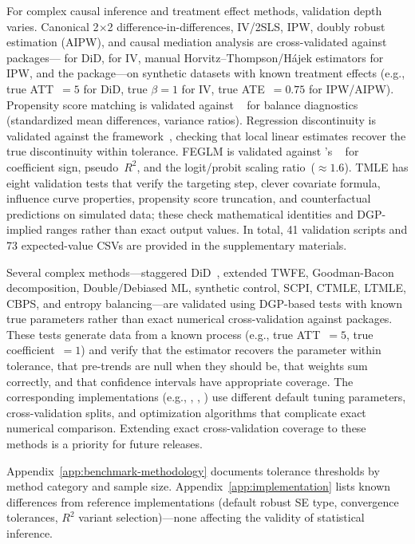 For complex causal inference and treatment effect methods, validation
depth varies. Canonical 2$\times$2 difference-in-differences, IV/2SLS,
IPW, doubly robust estimation (AIPW), and causal mediation analysis
are cross-validated against  packages--- for DiD,
 for IV, manual Horvitz--Thompson/H\'{a}jek estimators for
IPW, and the  package---on
synthetic datasets with known treatment effects (e.g., true ATT~$=5$
for DiD, true $\beta=1$ for IV, true ATE~$=0.75$ for IPW/AIPW).
Propensity score matching is validated against
~\citep{Ho+etal:2011} for balance diagnostics
(standardized mean differences, variance ratios).  Regression
discontinuity is validated against the 
framework~\citep{Calonico+etal:2014}, checking that local
linear estimates recover the true discontinuity within tolerance.
FEGLM is validated against 's
~\citep{Berge:2018} for coefficient sign, pseudo~$R^2$,
and the logit/probit scaling ratio~($\approx 1.6$).  TMLE has eight
validation tests that verify the targeting step, clever covariate
formula, influence curve properties, propensity score truncation, and
counterfactual predictions on simulated data; these check mathematical
identities and DGP-implied ranges rather than exact 
output values. In total, 41  validation scripts and
73 expected-value CSVs are provided in the supplementary materials.

Several complex methods---staggered
DiD~\citep{Callaway+SantAnna:2021}, extended TWFE, Goodman-Bacon
decomposition, Double/Debiased ML, synthetic control, SCPI, CTMLE,
LTMLE, CBPS, and entropy balancing---are validated using
DGP-based tests with known true parameters rather than exact numerical
cross-validation against  packages.  These tests generate
data from a known process (e.g., true ATT~$=5$, true coefficient~$=1$)
and verify that the estimator recovers the parameter within tolerance,
that pre-trends are null when they should be, that weights sum correctly,
and that confidence intervals have appropriate coverage.
The corresponding  implementations (e.g.,
, , ) use different default tuning
parameters, cross-validation splits, and optimization algorithms that
complicate exact numerical comparison.  Extending
exact cross-validation coverage to these methods is a priority for future
releases.

Appendix~\ref{app:benchmark-methodology} documents tolerance
thresholds by method category and sample size.
Appendix~\ref{app:implementation} lists known differences from
reference implementations (default robust SE type, convergence
tolerances, $R^2$ variant selection)---none affecting the validity
of statistical inference.

